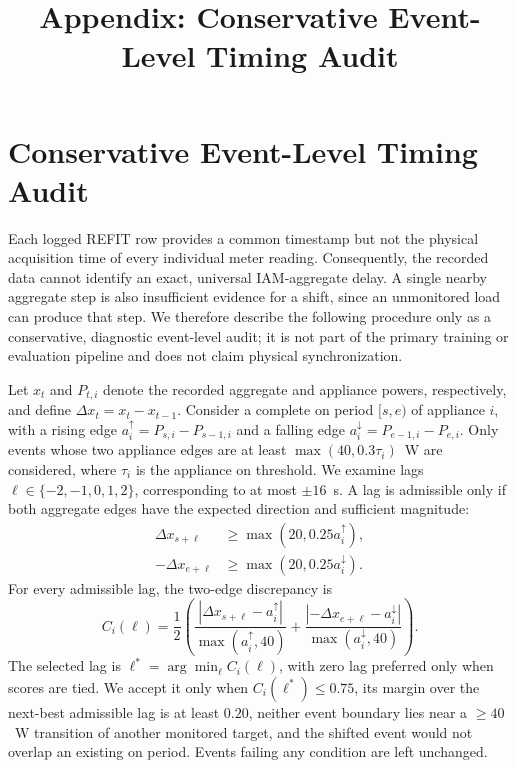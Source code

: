\documentclass[conference]{IEEEtran}
\title{Appendix: Conservative Event-Level Timing Audit}
\author{}
\begin{document}
\maketitle

\appendices

\section{Conservative Event-Level Timing Audit}
\label{sec:appendix-alignment}

Each logged REFIT row provides a common timestamp but not the physical acquisition time of every individual meter reading.  Consequently, the recorded data cannot identify an exact, universal IAM-aggregate delay.  A single nearby aggregate step is also insufficient evidence for a shift, since an unmonitored load can produce that step.  We therefore describe the following procedure only as a conservative, diagnostic event-level audit; it is not part of the primary training or evaluation pipeline and does not claim physical synchronization.

Let $x_t$ and $P_{t,i}$ denote the recorded aggregate and appliance powers, respectively, and define $\Delta x_t=x_t-x_{t-1}$.  Consider a complete on period $[s,e)$ of appliance $i$, with a rising edge $a_i^{\uparrow}=P_{s,i}-P_{s-1,i}$ and a falling edge $a_i^{\downarrow}=P_{e-1,i}-P_{e,i}$.  Only events whose two appliance edges are at least $\max(40,0.3\tau_i)$~W are considered, where $\tau_i$ is the appliance on threshold.  We examine lags $\ell\in\{-2,-1,0,1,2\}$, corresponding to at most $\pm16$~s.  A lag is admissible only if both aggregate edges have the expected direction and sufficient magnitude:
\begin{equation}
\begin{aligned}
\Delta x_{s+\ell}&\geq\max(20,0.25a_i^{\uparrow}),\\
-\Delta x_{e+\ell}&\geq\max(20,0.25a_i^{\downarrow}).
\end{aligned}
\label{eq:alignment-gate}
\end{equation}
For every admissible lag, the two-edge discrepancy is
\begin{equation}
C_i(\ell)=\frac{1}{2}\left(
\frac{|\Delta x_{s+\ell}-a_i^{\uparrow}|}{\max(a_i^{\uparrow},40)}+
\frac{|{-\Delta x_{e+\ell}}-a_i^{\downarrow}|}{\max(a_i^{\downarrow},40)}
\right).
\label{eq:alignment-score}
\end{equation}
The selected lag is $\ell^*=\arg\min_{\ell}C_i(\ell)$, with zero lag preferred only when scores are tied.  We accept it only when $C_i(\ell^*)\leq0.75$, its margin over the next-best admissible lag is at least $0.20$, neither event boundary lies near a $\geq40$~W transition of another monitored target, and the shifted event would not overlap an existing on period.  Events failing any condition are left unchanged.
\end{document}

